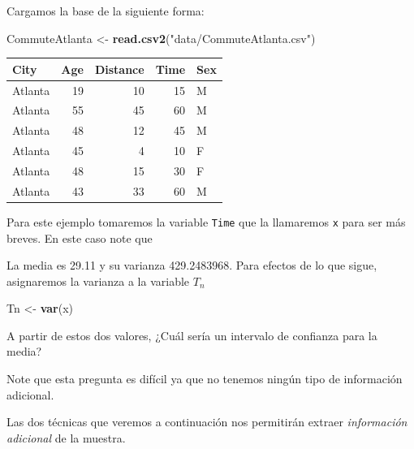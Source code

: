 \documentclass[
  12pt,
]{book}
\newenvironment{Shaded}{\begin{snugshade}}{\end{snugshade}}
\newcommand{\KeywordTok}[1]{\textcolor[rgb]{0.13,0.29,0.53}{\textbf{#1}}}
\newcommand{\NormalTok}[1]{#1}
\newcommand{\OperatorTok}[1]{\textcolor[rgb]{0.81,0.36,0.00}{\textbf{#1}}}
\newcommand{\StringTok}[1]{\textcolor[rgb]{0.31,0.60,0.02}{#1}}
\theoremstyle{definition}
\theoremstyle{definition}
\theoremstyle{definition}
\theoremstyle{remark}
\begin{document}
Cargamos la base de la siguiente forma:

\begin{Shaded}
\begin{Highlighting}[]
\NormalTok{CommuteAtlanta <-}\StringTok{ }\KeywordTok{read.csv2}\NormalTok{(}\StringTok{"data/CommuteAtlanta.csv"}\NormalTok{)}
\end{Highlighting}
\end{Shaded}

\begin{tabular}{l|r|r|r|l}
\hline
City & Age & Distance & Time & Sex\\
\hline
Atlanta & 19 & 10 & 15 & M\\
\hline
Atlanta & 55 & 45 & 60 & M\\
\hline
Atlanta & 48 & 12 & 45 & M\\
\hline
Atlanta & 45 & 4 & 10 & F\\
\hline
Atlanta & 48 & 15 & 30 & F\\
\hline
Atlanta & 43 & 33 & 60 & M\\
\hline
\end{tabular}

Para este ejemplo tomaremos la variable \texttt{Time} que la
llamaremos \texttt{x} para ser más breves. En este caso note que

\begin{Shaded}
\end{Shaded}

La media es 29.11 y su varianza 429.2483968. Para efectos de lo que sigue, asignaremos la varianza a la variable \(T_n\)

\begin{Shaded}
\begin{Highlighting}[]
\NormalTok{Tn <-}\StringTok{ }\KeywordTok{var}\NormalTok{(x)}
\end{Highlighting}
\end{Shaded}

A partir de estos dos valores, ¿Cuál sería un intervalo de confianza
para la media?

Note que esta pregunta es difícil ya que no tenemos ningún tipo de
información adicional.

Las dos técnicas que veremos a continuación nos permitirán extraer
\emph{información adicional} de la muestra.
\end{document}
